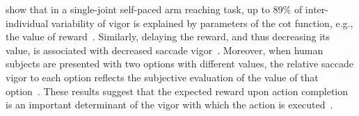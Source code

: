  show that in a single-joint self-paced arm reaching task, up to 89\% of inter-individual variability of vigor is explained by parameters of the \gls{cot} function, e.g., the value of reward~\cite{Berret2018SciReports}.
Similarly, delaying the reward, and thus decreasing its value, is associated with decreased saccade vigor~\cite{Shadmehr2010Jneurosci}.
Moreover, when human subjects are presented with two options with different values, the relative saccade vigor to each option reflects the subjective evaluation of the value of that option~\cite{Reppert2015JNeurosci}.
These results suggest that the expected reward upon action completion is an important determinant of the vigor with which the action is executed~\cite[see][for a review]{Shadmehr2019TINS}.
